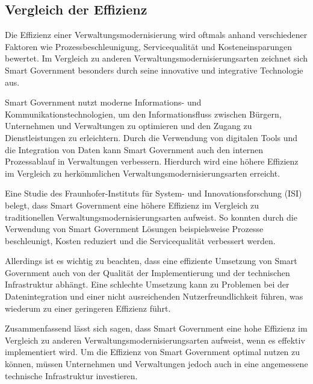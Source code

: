 \subsection{Vergleich der Effizienz}
Die Effizienz einer Verwaltungsmodernisierung wird oftmals anhand verschiedener Faktoren wie Prozessbeschleunigung, Servicequalität und Kosteneinsparungen bewertet.
Im Vergleich zu anderen Verwaltungsmodernisierungsarten zeichnet sich Smart Government besonders durch seine innovative und integrative Technologie aus.
\par
Smart Government nutzt moderne Informations- und Kommunikationstechnologien, um den Informationsfluss zwischen Bürgern, Unternehmen und Verwaltungen zu optimieren und den Zugang zu Dienstleistungen zu erleichtern.
Durch die Verwendung von digitalen Tools und die Integration von Daten kann Smart Government auch den internen Prozessablauf in Verwaltungen verbessern.
Hierdurch wird eine höhere Effizienz im Vergleich zu herkömmlichen Verwaltungsmodernisierungsarten erreicht.
\par
Eine Studie des Fraunhofer-Instituts für System- und Innovationsforschung (ISI) belegt, dass Smart Government eine höhere Effizienz im Vergleich zu traditionellen Verwaltungsmodernisierungsarten aufweist.
So konnten durch die Verwendung von Smart Government Lösungen beispielsweise Prozesse beschleunigt, Kosten reduziert und die Servicequalität verbessert werden.
\par
Allerdings ist es wichtig zu beachten, dass eine effiziente Umsetzung von Smart Government auch von der Qualität der Implementierung und der technischen Infrastruktur abhängt.
Eine schlechte Umsetzung kann zu Problemen bei der Datenintegration und einer nicht ausreichenden Nutzerfreundlichkeit führen, was wiederum zu einer geringeren Effizienz führt.
\par
Zusammenfassend lässt sich sagen, dass Smart Government eine hohe Effizienz im Vergleich zu anderen Verwaltungsmodernisierungsarten aufweist, wenn es effektiv implementiert wird.
Um die Effizienz von Smart Government optimal nutzen zu können, müssen Unternehmen und Verwaltungen jedoch auch in eine angemessene technische Infrastruktur investieren.
